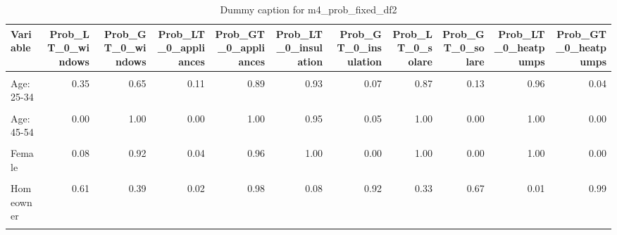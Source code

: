 \begin{table}
\centering
\caption{Dummy caption for m4_prob_fixed_df2}
\centering
\fontsize{10}{12}\selectfont
\begin{tabular}[t]{lrrrrrrrrrr}
\toprule
Variable & Prob\_LT\_0\_windows & Prob\_GT\_0\_windows & Prob\_LT\_0\_appliances & Prob\_GT\_0\_appliances & Prob\_LT\_0\_insulation & Prob\_GT\_0\_insulation & Prob\_LT\_0\_solare & Prob\_GT\_0\_solare & Prob\_LT\_0\_heatpumps & Prob\_GT\_0\_heatpumps\\
\midrule
\cellcolor{gray!10}{Intercept} & \cellcolor{gray!10}{1.00} & \cellcolor{gray!10}{0.00} & \cellcolor{gray!10}{0.57} & \cellcolor{gray!10}{0.43} & \cellcolor{gray!10}{1.00} & \cellcolor{gray!10}{0.00} & \cellcolor{gray!10}{1.00} & \cellcolor{gray!10}{0.00} & \cellcolor{gray!10}{1.00} & \cellcolor{gray!10}{0.00}\\
Age: 25-34 & 0.35 & 0.65 & 0.11 & 0.89 & 0.93 & 0.07 & 0.87 & 0.13 & 0.96 & 0.04\\
\cellcolor{gray!10}{Age: 35-44} & \cellcolor{gray!10}{0.01} & \cellcolor{gray!10}{0.99} & \cellcolor{gray!10}{0.01} & \cellcolor{gray!10}{0.99} & \cellcolor{gray!10}{0.99} & \cellcolor{gray!10}{0.01} & \cellcolor{gray!10}{1.00} & \cellcolor{gray!10}{0.00} & \cellcolor{gray!10}{1.00} & \cellcolor{gray!10}{0.00}\\
Age: 45-54 & 0.00 & 1.00 & 0.00 & 1.00 & 0.95 & 0.05 & 1.00 & 0.00 & 1.00 & 0.00\\
\cellcolor{gray!10}{Age: 55+} & \cellcolor{gray!10}{0.00} & \cellcolor{gray!10}{1.00} & \cellcolor{gray!10}{0.00} & \cellcolor{gray!10}{1.00} & \cellcolor{gray!10}{0.03} & \cellcolor{gray!10}{0.97} & \cellcolor{gray!10}{1.00} & \cellcolor{gray!10}{0.00} & \cellcolor{gray!10}{1.00} & \cellcolor{gray!10}{0.00}\\
Female & 0.08 & 0.92 & 0.04 & 0.96 & 1.00 & 0.00 & 1.00 & 0.00 & 1.00 & 0.00\\
\cellcolor{gray!10}{Higher education} & \cellcolor{gray!10}{0.01} & \cellcolor{gray!10}{0.99} & \cellcolor{gray!10}{0.33} & \cellcolor{gray!10}{0.67} & \cellcolor{gray!10}{0.00} & \cellcolor{gray!10}{1.00} & \cellcolor{gray!10}{0.00} & \cellcolor{gray!10}{1.00} & \cellcolor{gray!10}{0.08} & \cellcolor{gray!10}{0.92}\\
Homeowner & 0.61 & 0.39 & 0.02 & 0.98 & 0.08 & 0.92 & 0.33 & 0.67 & 0.01 & 0.99\\
\cellcolor{gray!10}{D-Type: House} & \cellcolor{gray!10}{0.38} & \cellcolor{gray!10}{0.62} & \cellcolor{gray!10}{0.05} & \cellcolor{gray!10}{0.95} & \cellcolor{gray!10}{0.03} & \cellcolor{gray!10}{0.97} & \cellcolor{gray!10}{0.94} & \cellcolor{gray!10}{0.06} & \cellcolor{gray!10}{0.86} & \cellcolor{gray!10}{0.14}\\

\end{tabular}
\end{table}
